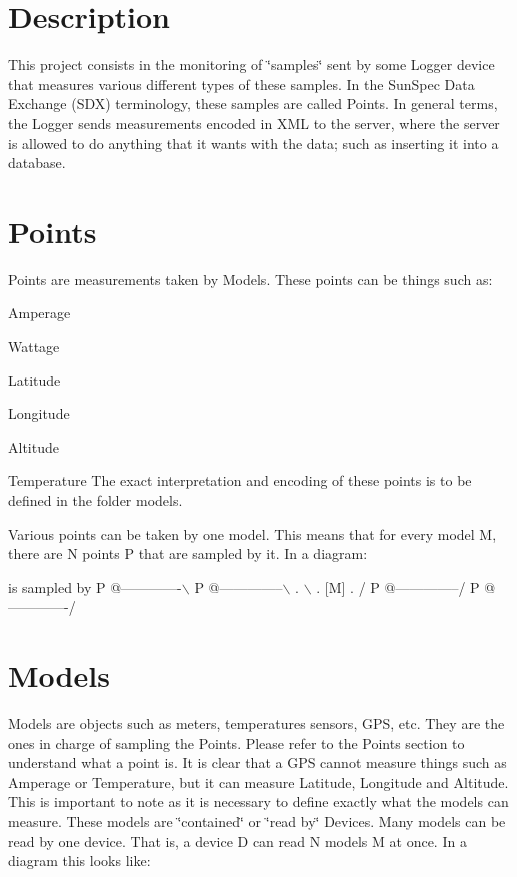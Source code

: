\hypertarget{index_Description}{}\section{Description}\label{index_Description}
This project consists in the monitoring of \char`\"{}samples\char`\"{} sent by some {\ttfamily Logger} device that measures various different types of these samples. In the Sun\+Spec Data Exchange (S\+DX) terminology, these samples are called {\ttfamily Points}. In general terms, the {\ttfamily Logger} sends measurements encoded in X\+ML to the server, where the server is allowed to do anything that it wants with the data; such as inserting it into a database.\hypertarget{index_Points}{}\section{Points}\label{index_Points}
Points are measurements taken by {\ttfamily Models}. These points can be things such as\+:
\begin{DoxyItemize}
\item Amperage
\item Wattage
\item Latitude
\item Longitude
\item Altitude
\item Temperature The exact interpretation and encoding of these points is to be defined in the folder {\ttfamily models}.
\end{DoxyItemize}

Various points can be taken by one model. This means that for every model {\ttfamily M}, there are {\ttfamily N} points {\ttfamily P} that are sampled by it. In a diagram\+: 
\begin{DoxyCode}
  is sampled by
P @-------------\(\backslash\)
P @--------------\(\backslash\)
.                 \(\backslash\)
.                 [M]
.                 /
P @--------------/
P @-------------/
\end{DoxyCode}
 \hypertarget{index_Models}{}\section{Models}\label{index_Models}
Models are objects such as meters, temperatures sensors, G\+PS, etc. They are the ones in charge of sampling the {\ttfamily Points}. Please refer to the {\ttfamily Points} section to understand what a point is. It is clear that a G\+PS cannot measure things such as Amperage or Temperature, but it can measure Latitude, Longitude and Altitude. This is important to note as it is necessary to define exactly what the models can measure. These models are \char`\"{}contained\char`\"{} or \char`\"{}read by\char`\"{} {\ttfamily Devices}. Many models can be read by one device. That is, a device {\ttfamily D} can read {\ttfamily N} models {\ttfamily M} at once. In a diagram this looks like\+:


